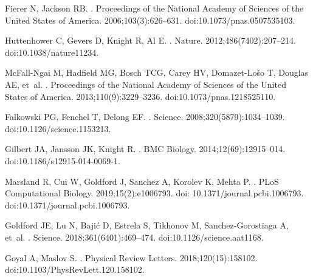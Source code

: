 \documentclass[10pt,letterpaper]{article}
\begin{document}
\begin{thebibliography}{10}

Fierer N, Jackson RB.
.
\newblock Proceedings of the National Academy of Sciences of the United States
  of America. 2006;103(3):626--631.
\newblock doi:{10.1073/pnas.0507535103}.

Huttenhower C, Gevers D, Knight R, Al E.
.
\newblock Nature. 2012;486(7402):207–214.
\newblock doi:{10.1038/nature11234}.

McFall-Ngai M, Hadfield MG, Bosch TCG, Carey HV, Domazet-Lo{\v{s}}o T, Douglas
  AE, et~al.
.
\newblock Proceedings of the National Academy of Sciences of the United States of America. 2013;110(9):3229--3236.
\newblock doi:{10.1073/pnas.1218525110}.

Falkowski PG, Fenchel T, Delong EF.
.
\newblock Science. 2008;320(5879):1034--1039.
\newblock doi:{10.1126/science.1153213}.

Gilbert JA, Jansson JK, Knight R.
.
\newblock BMC Biology. 2014;12(69):12915--014.
\newblock doi:{10.1186/s12915-014-0069-1}.

Marsland R, Cui W, Goldford J, Sanchez A, Korolev K, Mehta P.
.
\newblock PLoS Computational Biology. 2019;15(2):e1006793. doi:
  10.1371/journal.pcbi.1006793.
\newblock doi:{10.1371/journal.pcbi.1006793}.

Goldford JE, Lu N, Baji{\'{c}} D, Estrela S, Tikhonov M, Sanchez-Gorostiaga A,
  et~al.
.
\newblock Science. 2018;361(6401):469--474.
\newblock doi:{10.1126/science.aat1168}.

Goyal A, Maslov S.
.
\newblock Physical Review Letters. 2018;120(15):158102.
\newblock doi:{10.1103/PhysRevLett.120.158102}.


\end{thebibliography}
\end{document}
